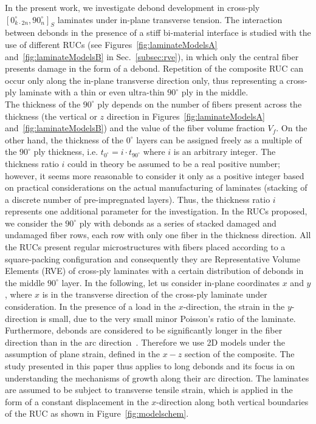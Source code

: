 \documentclass[review]{elsarticle}
\begin{document}
In the present work, we investigate debond development in cross-ply $\left[0_{k\cdot2n}^{\circ},90_{n}^{\circ}\right]_{S}$ laminates under in-plane transverse tension. The interaction between debonds in the presence of a stiff bi-material interface is studied with the use of different RUCs (see Figures~\ref{fig:laminateModelsA} and~\ref{fig:laminateModelsB} in Sec.~\ref{subsec:rve}), in which only the central fiber presents damage in the form of a debond. Repetition of the composite RUC can occur only along the in-plane transverse direction only, thus representing a cross-ply laminate with a thin or even ultra-thin $90^{\circ}$ ply in the middle.\\
The thickness of the $90^{\circ}$ ply depends on the number of fibers present across the thickness (the vertical or $z$ direction in Figures~\ref{fig:laminateModelsA} and~\ref{fig:laminateModelsB}) and the value of the fiber volume fraction $V_{f}$. On the other hand, the thickness of the $0^{\circ}$ layers can be assigned freely as a multiple of the $90^{\circ}$ ply thickness, i.e. $t_{0^{\circ}}=i\cdot t_{90^{\circ}}$ where $i$ is an arbitrary integer. The thickness ratio $i$ could in theory be assumed to be a real positive number; however, it seems more reasonable to consider it only as a positive integer based on practical considerations on the actual manufacturing  of laminates (stacking of a discrete number of pre-impregnated layers). Thus, the thickness ratio $i$ represents one additional parameter for the investigation. In the RUCs proposed, we consider the $90^{\circ}$ ply with debonds as a series of stacked damaged and undamaged fiber rows, each row with only one fiber in the thickness direction. All the RUCs present regular microstructures with fibers placed according to a square-packing configuration and consequently they are Representative Volume Elements (RVE) of cross-ply laminates with a certain distribution of debonds in the middle $90^{\circ}$ layer. In the following, let us consider in-plane coordinates $x$ and $y$, where $x$ is in the transverse direction of the cross-ply laminate under consideration. In the presence of a load in the $x$-direction, the strain in the $y$-direction is small, due to the very small minor Poisson's ratio of the laminate. Furthermore, debonds are considered to be significantly longer in the fiber direction than in the arc direction~\cite{Zhang1997}. Therefore we use 2D models under the assumption of plane strain, defined in the $x-z$ section of the composite. The study presented in this paper thus applies to long debonds and its focus ia on understanding the mechanisms of growth along their arc direction. The laminates are assumed to be subject to transverse tensile strain, which is applied in the form of a constant displacement in the $x$-direction along both vertical boundaries of the RUC as shown in  Figure~\ref{fig:modelschem}.\\
\end{document}
